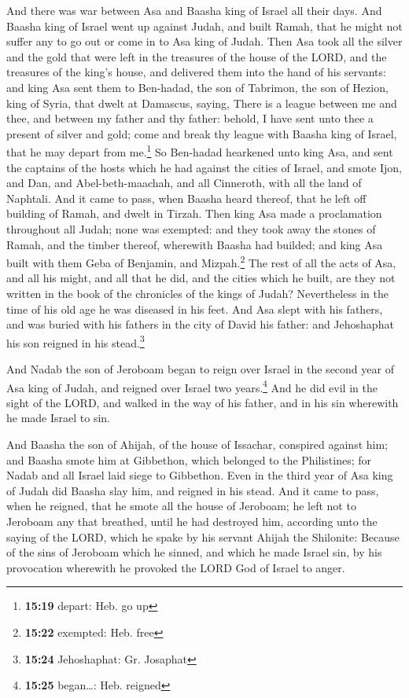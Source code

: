  And there was war between Asa and Baasha king of Israel
all their days.  And Baasha king of Israel went up
against Judah, and built Ramah, that he might not suffer any to go out
or come in to Asa king of Judah.  Then Asa took all the
silver and the gold that were left in the treasures of the house of the
LORD, and the treasures of the king's house, and delivered them into the
hand of his servants: and king Asa sent them to Ben-hadad, the son of
Tabrimon, the son of Hezion, king of Syria, that dwelt at Damascus,
saying,  There is a league between me and thee, and
between my father and thy father: behold, I have sent unto thee a
present of silver and gold; come and break thy league with Baasha king
of Israel, that he may depart from me.\footnote{\textbf{15:19} depart:
  Heb. go up}  So Ben-hadad hearkened unto king Asa, and
sent the captains of the hosts which he had against the cities of
Israel, and smote Ijon, and Dan, and Abel-beth-maachah, and all
Cinneroth, with all the land of Naphtali.  And it came to
pass, when Baasha heard thereof, that he left off building of Ramah, and
dwelt in Tirzah.  Then king Asa made a proclamation
throughout all Judah; none was exempted: and they took away the stones
of Ramah, and the timber thereof, wherewith Baasha had builded; and king
Asa built with them Geba of Benjamin, and Mizpah.\footnote{\textbf{15:22}
  exempted: Heb. free}  The rest of all the acts of Asa,
and all his might, and all that he did, and the cities which he built,
are they not written in the book of the chronicles of the kings of
Judah? Nevertheless in the time of his old age he was diseased in his
feet.  And Asa slept with his fathers, and was buried
with his fathers in the city of David his father: and Jehoshaphat his
son reigned in his stead.\footnote{\textbf{15:24} Jehoshaphat: Gr.
  Josaphat}

 And Nadab the son of Jeroboam began to reign over Israel
in the second year of Asa king of Judah, and reigned over Israel two
years.\footnote{\textbf{15:25} began\ldots: Heb. reigned}
 And he did evil in the sight of the LORD, and walked in
the way of his father, and in his sin wherewith he made Israel to sin.

 And Baasha the son of Ahijah, of the house of Issachar,
conspired against him; and Baasha smote him at Gibbethon, which belonged
to the Philistines; for Nadab and all Israel laid siege to Gibbethon.
 Even in the third year of Asa king of Judah did Baasha
slay him, and reigned in his stead.  And it came to pass,
when he reigned, that he smote all the house of Jeroboam; he left not to
Jeroboam any that breathed, until he had destroyed him, according unto
the saying of the LORD, which he spake by his servant Ahijah the
Shilonite:  Because of the sins of Jeroboam which he
sinned, and which he made Israel sin, by his provocation wherewith he
provoked the LORD God of Israel to anger.

